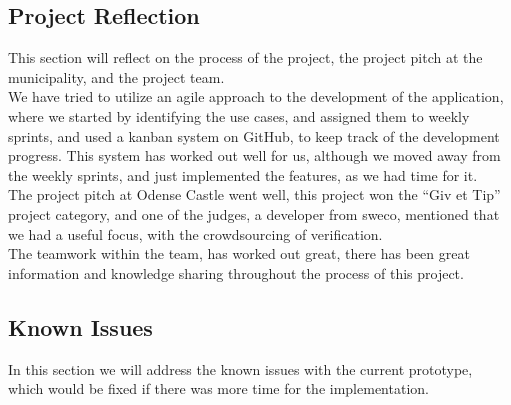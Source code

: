 \subsection{Project Reflection}
This section will reflect on the process of the project, the project pitch at the municipality, and the project team.
~\\

We have tried to utilize an agile approach to the development of the application, where we started by identifying the use cases, and assigned them to weekly sprints, and used a kanban system on GitHub, to keep track of the development progress. This system has worked out well for us, although we moved away from the weekly sprints, and just implemented the features, as we had time for it.
~\\

The project pitch at Odense Castle went well, this project won the “Giv et Tip” project category, and one of the judges, a developer from sweco, mentioned that we had a useful focus, with the crowdsourcing of verification.
~\\
The teamwork within the team, has worked out great, there has been great information and knowledge sharing throughout the process of this project.

\subsection{Known Issues}
In this section we will address the known issues with the current prototype, which would be fixed if there was more time for the implementation.

